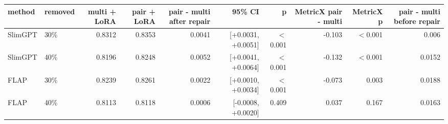 \begin{tabular}{llrrrrrrrr}
\toprule
method & removed & multi + LoRA & pair + LoRA & pair - multi after repair & 95\% CI & p & MetricX pair - multi & MetricX p & pair - multi before repair \\
\midrule
SlimGPT & 30\% & 0.8312 & 0.8353 & 0.0041 & [+0.0031, +0.0051] & $<$0.001 & -0.103 & $<$0.001 & 0.006 \\
SlimGPT & 40\% & 0.8196 & 0.8248 & 0.0052 & [+0.0041, +0.0064] & $<$0.001 & -0.132 & $<$0.001 & 0.0152 \\
FLAP & 30\% & 0.8239 & 0.8261 & 0.0022 & [+0.0010, +0.0034] & $<$0.001 & -0.073 & 0.003 & 0.0188 \\
FLAP & 40\% & 0.8113 & 0.8118 & 0.0006 & [-0.0008, +0.0020] & 0.409 & 0.037 & 0.167 & 0.0163 \\
\bottomrule
\end{tabular}
